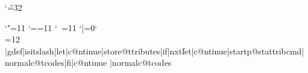 \def\proc@ttribs{%
  \trace{A}{Processing attributes (\ifin@ttrib true\else false\fi)}%
  \ifin@ttrib
    \trace{A}{Attributes specified:\attrib@rgs}%
    \parse@ttribs{\attrib@rgs}%
    \in@ttribfalse
  \fi
  \catcode`\|=12
}


\def\setdefaultattrib#1#2{\trace{A}{Default attrib for #1 is #2}\x@\def\csname defaultattrkey-#1\endcsname{#2}}

\edef\p@stattribcmd{}%
\def\store@ttributes#1{\def\newbit{#1}\message{'\newbit'}\edef\@ttributes{\@ttributes\newbit}\futurelet\nxt\isitslash}                                                                    
\def\startp@stattribcmd#1{\futurelet\nxt\isitcmd}
\def\storep@stattribcmd#1{\def\newbit{#1}\message{"\newbit"}\edef\p@stattribcmd{\p@stattribcmd\newbit}\futurelet\nxt\isitcmd}                                                                          
\lccode`\~=32
\lowercase{
 \gdef\isitcmd{%
        \let\c@ntinue\storep@stattribcmd
        \ifcat a\nxt\else\ifcat=\nxt \else
	\let\c@ntinue\end@ttributegrab\fi\fi\c@ntinue}%
}

\def\oddc@tcodes{\catcode`"=11 \catcode`==11 
\catcode`\ =11 \catcode`|=0\catcode`\\=12}                                                                                 
\def\normalc@tcodes{\catcode`"=12 \catcode`==12 
\catcode`\ =10\catcode`\\=0\catcode`\|=12}                                                                              
%


\xdef\attribsus@d{}%

\def\start@ttributegrab{\let\c@ntinue\isitslash\oddc@tcodes\futurelet\nxt\c@ntinue}
\def\end@ttributegrab{%
  \xdef\@ttributes{\x@\detokenize\x@{\@ttributes}}%
  \message{Now executing \p@stattribcmd}%
  \csname\p@stattribcmd\endcsname}%

\oddc@tcodes%
|gdef|isitslash{|let|c@ntinue|store@ttributes|if|nxt\|let|c@ntinue|startp@stattribcmd|normalc@tcodes|fi|c@ntinue}%
|normalc@tcodes%
%

\def\default@ttrkey{} %
\def\thisdefault@ttrkey{} %
\def\relaxval{\relax}

